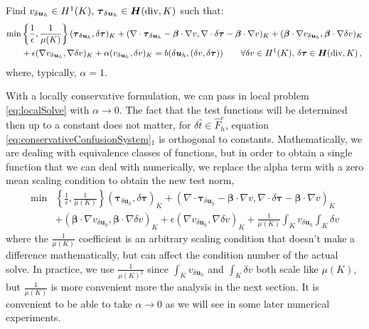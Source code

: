 \documentclass[letterpaper]{article}
\def\btau{\boldsymbol\tau}
\def\bbeta{\boldsymbol\beta}
\newcommand{\bs}[1]{\boldsymbol{#1}}
\newcommand{\bfH}{\mbox{\boldmath $H$}}
\newcommand{\HdivK}{\bfH(\text{div},K)}
\newcommand{\HOneK}{H^{1}(K)}
\newcommand{\vdeltau}{v_{\delta\bs u_h}}
\newcommand{\taudeltau}{\btau_{\delta\bs u_h}}
\begin{document}
Find $\vdeltau\in\HOneK,\,\taudeltau\in\HdivK$ such that:
\begin{align}
\min&\left\{\frac{1}{\epsilon},\frac{1}{\mu(K)}\right\}(\taudeltau,\delta\btau)_K
+(\nabla\cdot\taudeltau-\bbeta\cdot\nabla
v,\nabla\cdot\delta\btau-\bbeta\cdot\nabla v)_K
+(\bbeta\cdot\nabla\vdeltau,\bbeta\cdot\nabla \delta v)_K\nonumber\\
&+\epsilon(\nabla\vdeltau,\nabla \delta v)_K
+\alpha(\vdeltau,\delta v)_K
=b(\delta\bs u_h,(\delta v,\delta\btau))
\quad\quad\forall\delta v\in\HOneK,\,\delta\btau\in\HdivK\,,
\label{eq:localSolve}
\end{align}
where, typically, $\alpha=1$.

With a locally conservative formulation, we can pass in local problem
\eqref{eq:localSolve} with $\alpha\rightarrow0$. The fact that the test
functions will be determined then up to a constant does not matter, for
$\delta\hat t\in\hat F_h^e$, equation
\eqref{eq:conservativeConfusionSystem}$_1$ is orthogonal to constants.
Mathematically, we are dealing with equivalence classes of functions, but in
order to obtain a single function that we can deal with numerically, we
replace the alpha term with a zero mean scaling condition to obtain the new
test norm,
\begin{align}
\label{eq:localSolveMod}
\min&\left\{\frac{1}{\epsilon},\frac{1}{\mu(K)}\right\}(\taudeltau,\delta\btau)_K
+(\nabla\cdot\taudeltau-\bbeta\cdot\nabla
v,\nabla\cdot\delta\btau-\bbeta\cdot\nabla v)_K\\
&+(\bbeta\cdot\nabla\vdeltau,\bbeta\cdot\nabla \delta v)_K\nonumber
+\epsilon(\nabla\vdeltau,\nabla \delta v)_K
+\frac{1}{\mu(K)}\int_K\vdeltau\int_K\delta v
\end{align}
where the $\frac{1}{\mu(K)}$ coefficient is an arbitrary scaling condition
that doesn't make a difference mathematically, but can affect the condition
number of the actual solve. In practice, we use $\frac{1}{\mu(K)^2}$
since $\int_K\vdeltau$ and $\int_K\delta v$ both scale like
$\mu(K)$, but $\frac{1}{\mu(K)}$ is more convenient more the analysis in the
next section.
It is convenient to be able to take $\alpha\rightarrow0$ as we will see in
some later numerical experiments.
\end{document}
